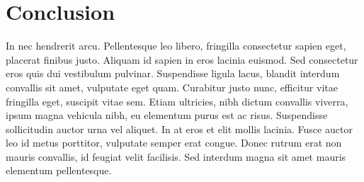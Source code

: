 \documentclass[twoside,11pt]{article}
\begin{document}
\section{Conclusion}
\label{sec:conc}

In nec hendrerit arcu. Pellentesque leo libero, fringilla consectetur sapien eget, placerat finibus justo. Aliquam id sapien in eros lacinia euismod. Sed consectetur eros quis dui vestibulum pulvinar. Suspendisse ligula lacus, blandit interdum convallis sit amet, vulputate eget quam. Curabitur justo nunc, efficitur vitae fringilla eget, suscipit vitae sem. Etiam ultricies, nibh dictum convallis viverra, ipsum magna vehicula nibh, eu elementum purus est ac risus. Suspendisse sollicitudin auctor urna vel aliquet. In at eros et elit mollis lacinia. Fusce auctor leo id metus porttitor, vulputate semper erat congue. Donec rutrum erat non mauris convallis, id feugiat velit facilisis. Sed interdum magna sit amet mauris elementum pellentesque.

\vskip 0.2in
 
\end{document}
